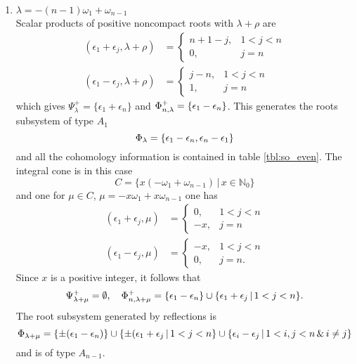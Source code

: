 \begin{enumerate}
 \item $ \lambda = -(n-1)\omega_1  + \omega_{n-1}$\\
  Scalar products of positive noncompact roots with $\lambda+\rho$ are
  \begin{align*}
    (\epsilon_1 + \epsilon_j, \lambda+\rho) & = \begin{cases}
                                                 n+1-j, & 1<j < n \\
                                                 0, & j = n
                                                \end{cases}\\
    (\epsilon_1 - \epsilon_j, \lambda+\rho) & = \begin{cases}
                                                j-n, & 1<j < n \\
                                                 1, & j = n
                                                \end{cases}
  \end{align*}
  which gives $\Psi^+_\lambda = \{\epsilon_1 +\epsilon_n \}$ and $\Phi^+_{n,\lambda} = \{\epsilon_1 - \epsilon_n \}$. This generates the roots subsystem of type $A_1$
  \[
   \Phi_\lambda = \{ \epsilon_1 - \epsilon_n, \epsilon_n - \epsilon_1 \}
  \]
  and all the cohomology information is contained in table \ref{tbl:so_even}. The integral cone is in this case \[C = \{x(-\omega_1 + \omega_{n-1}) \,|\, x\in\mathbb{N}_0 \}\] and one for $\mu  \in C$, $\mu = -x\omega_1 + x\omega_{n-1}$ one has
  \begin{align*}
    (\epsilon_1 + \epsilon_j, \mu) & = \begin{cases}
                                                 0, & 1<j < n \\
                                                 -x, & j = n
                                                \end{cases}\\
    (\epsilon_1 - \epsilon_j, \mu) & = \begin{cases}
                                                -x, & 1<j < n \\
                                                 0, & j = n.
                                                \end{cases}
  \end{align*}
  Since $x$ is a positive integer, it follows that
  \[
   \Psi^+_{\lambda + \mu} = \emptyset, \quad \Phi^+_{n,\lambda+\mu} = \{ \epsilon_1 - \epsilon_n \} \cup \{\epsilon_1 + \epsilon_j \,|\, 1<j<n \}.
  \]
  The root subsystem generated by reflections is
  \[
   \Phi_{\lambda + \mu} = \{\pm(\epsilon_1-\epsilon_n)\} \cup \{\pm(\epsilon_1 + \epsilon_j \,|\, 1<j<n\} \cup \{ \epsilon_i - \epsilon_j \,|\, 1<i,j<n \,\&\, i \neq j\}
  \]
  and is of type $A_{n-1}$.

\end{enumerate}

